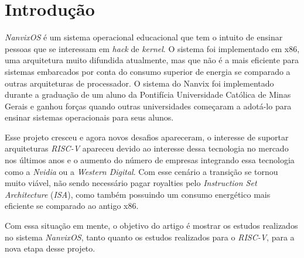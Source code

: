 \section{Introdução}

\emph{NanvixOS} é um sistema operacional educacional que tem o intuito de ensinar pessoas que se interessam em \emph{hack} de \emph{kernel}. 
O sistema foi implementado em x86, uma arquitetura muito difundida atualmente, mas que não é a mais eficiente para sistemas 
embarcados por conta do consumo superior de energia se comparado a outras arquiteturas de processador. O sistema do Nanvix foi 
implementado durante a graduação de um aluno da Pontifícia Universidade Católica de Minas Gerais e ganhou forças quando outras 
universidades começaram a adotá-lo para ensinar sistemas operacionais para seus alunos.

Esse projeto cresceu e agora novos desafios apareceram, o interesse de suportar arquiteturas \emph{RISC-V} apareceu devido ao 
interesse dessa tecnologia no mercado nos últimos anos e o aumento do número de empresas integrando essa tecnologia como a \emph{Nvidia} 
ou a \emph{Western Digital}. Com esse cenário a transição se tornou muito viável, não sendo necessário pagar royalties pelo \emph{Instruction Set Architecture}
(\emph{ISA}), como também possuindo um consumo energético mais eficiente se comparado ao antigo x86.  

Com essa situação em mente, o objetivo do artigo é mostrar os estudos realizados no sistema \emph{NanvixOS}, tanto quanto os 
estudos realizados para o \emph{RISC-V}, para a nova etapa desse projeto.